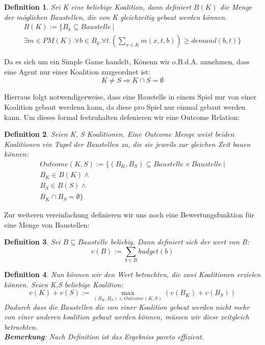 \documentclass[12pt]{article}
\theoremstyle{break}
\newtheorem{definition}{Definition}
\begin{document}
\begin{definition}
  Sei K eine beliebige Koalition, dann definiert $B(K)$ die Menge der möglichen Baustellen, die von K gleichzeitig gebaut werden können.
  \begin{eqnarray}
    B(K) := \{ B_k\subseteq Baustelle\ |\\
    \exists m\in PM(K).\forall b\in B_k.\forall t.(\sum_{x\in K}m(x,t,b))\geq demand(b, t)\}
  \end{eqnarray}
\end{definition}

Da es sich um ein Simple Game handelt, Könenn wir o.B.d.A. annehmen, dass eine Agent nur einer Koalition zuzgeordnet ist:
\begin{equation}
  K\neq S \Rightarrow K\cap S =\emptyset \label{koalitiondisjunct}
\end{equation}

Hierraus folgt notwendigerweise, dass eine Baustelle in einem Spiel nur von einer Koalition gebaut werdenn kann, da diese pro Spiel nur einmal gebaut werden kann. Um dieses formal festzuhalten defenieren wir eine Outcome Relation:

\begin{definition}
  Seien K, S Koalitionen. Eine Outcome Menge weist beiden Koalitionen ein Tupel der Baustellen zu, die sie jeweils zur gleichen Zeit bauen können:
\begin{eqnarray}
  Outcome(K,S) := \{(B_K,B_S)\subseteq Baustelle\times Baustelle\ |\\B_K\in B(K) \land \\ B_S\in B(S)\land\\B_K\cap B_S =\emptyset \}
\end{eqnarray}
\end{definition}

Zur weiteren vereinfachung definieren wir uns noch eine Bewertungsfunktion für eine Menge von Baustellen:


\begin{definition}
  Sei $B\subseteq Baustelle$ beliebig. Dann definiert sich der wert von B:
  \begin{equation}
    v(B):=\sum_{b\in B} budget(b)
  \end{equation}
\end{definition}


\begin{definition}
  Nun können wir den Wert betrachten, die zwei Koalitionen erzielen können. Seien K,S beliebige Koalition:
\begin{equation}
  v(K) + v(S) := \max_{(B_K, B_S)\in Outcome(K,S)}(v(B_K)+v(B_S))
\end{equation}
Dadurch dass die Baustellen die von einer Koalition gebaut werden nicht mehr von einer anderen koalition gebaut werden können, müssen wir diese zeitgleich betrachten.\\
\textbf{Bemerkung}: Nach Definition ist das Ergebniss pareto effizient.
\end{definition}
\end{document}
